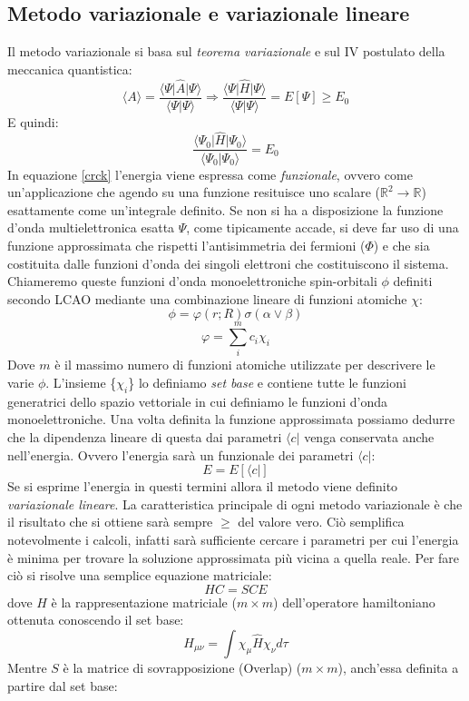\documentclass[oneside]{amsbook}
\numberwithin{section}{chapter}
\numberwithin{equation}{section}
\numberwithin{figure}{section}
\begin{document}
\subsection{Metodo variazionale e variazionale lineare}
Il metodo variazionale si basa sul \emph{teorema variazionale} e sul IV postulato della meccanica quantistica:
\begin{equation}
\label{crck}
\langle A\rangle=\frac{\langle\Psi\vert\hat{A}\vert\Psi\rangle}{\langle\Psi\vert\Psi\rangle} \Rightarrow\frac{\langle\Psi\vert\hat{H}\vert\Psi\rangle}{\langle\Psi\vert\Psi\rangle} = E[\Psi]\geq E_0
\end{equation}
E quindi:
\begin{equation}
\frac{\langle\Psi_0\vert\hat{H}\vert\Psi_0\rangle}{\langle\Psi_0\vert\Psi_0\rangle} = E_0
\end{equation}
In equazione \ref{crck} l'energia viene espressa come \emph{funzionale}, ovvero come un'applicazione che agendo su una funzione resituisce uno scalare ($\mathbb{R}^2\rightarrow\mathbb{R}$) esattamente come un'integrale definito.
Se non si ha a disposizione la funzione d'onda multielettronica esatta $\Psi$, come tipicamente accade, si deve far uso di una funzione approssimata che rispetti l'antisimmetria dei fermioni ($\Phi$) e che sia costituita dalle  funzioni d'onda dei singoli elettroni che costituiscono il sistema. Chiameremo queste funzioni d'onda monoelettroniche spin-orbitali $\phi$ definiti secondo LCAO mediante una combinazione lineare di funzioni atomiche $\chi$:
$$\phi=\varphi(r;R)\sigma (\alpha \vee \beta)$$
$$ \varphi=\sum \limits _i ^m c_i\chi_i $$
Dove $m$ è il massimo numero di funzioni atomiche utilizzate per descrivere le varie $\phi$. L'insieme \{$\chi_i$\} lo definiamo \emph{set base} e contiene tutte le funzioni generatrici dello spazio vettoriale in cui definiamo le funzioni d'onda monoelettroniche.
Una volta definita la funzione approssimata possiamo dedurre che la dipendenza lineare di questa dai parametri $\langle c\vert$ venga conservata anche nell'energia. Ovvero l'energia sarà un funzionale dei parametri $\langle c\vert$:
$$ E=E[\langle c\vert] $$
Se si esprime l'energia in questi termini allora il metodo viene definito \emph{variazionale lineare}.
La caratteristica principale di ogni metodo variazionale è che il risultato che si ottiene sarà sempre $\geq$ del valore vero. Ciò semplifica notevolmente i calcoli, infatti sarà sufficiente cercare i parametri per cui l'energia è minima per trovare la soluzione approssimata più vicina a quella reale. Per fare ciò si risolve una semplice equazione matriciale:
\begin{equation}
HC=SCE
\end{equation}
dove $H$ è la rappresentazione matriciale ($m\times m$) dell'operatore hamiltoniano ottenuta conoscendo il set base:
\begin{equation}
H_{\mu \nu}=\int \chi_{\mu}\hat{H}\chi_{\nu} d\tau
\end{equation}
Mentre $S$ è la matrice di sovrapposizione (Overlap) ($m\times m$), anch'essa definita a partire dal set base:
 
\end{document}
